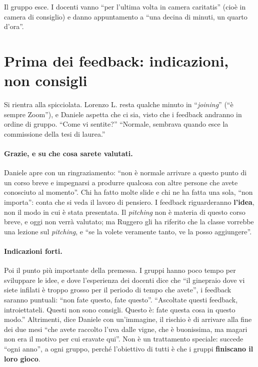 Il gruppo esce. I docenti vanno ``per l'ultima volta in camera caritatis'' (cioè in
camera di consiglio) e danno appuntamento a ``una decina di minuti, un quarto d'ora''.

\section{Prima dei feedback: indicazioni, non consigli}
\label{a11:sec:premessa}

Si rientra alla spicciolata. Lorenzo L. resta qualche minuto in ``\emph{joining}'' (``è
sempre Zoom''), e Daniele aspetta che ci sia, visto che i feedback andranno in ordine di
gruppo. ``Come vi sentite?'' ``Normale, sembrava quando esce la commissione della tesi di
laurea.''

\paragraph{Grazie, e su che cosa sarete valutati.} Daniele apre con un ringraziamento:
``non è normale arrivare a questo punto di un corso breve e impegnarsi a produrre
qualcosa con altre persone che avete conosciuto al momento''. Chi ha fatto molte slide e
chi ne ha fatta una sola, ``non importa'': conta che si veda il lavoro di pensiero. I
feedback riguarderanno \textbf{l'idea}, non il modo in cui è stata presentata. Il
\emph{pitching} non è materia di questo corso breve, e oggi non verrà valutato; ma Ruggero
gli ha riferito che la classe vorrebbe una lezione sul \emph{pitching}, e ``se la volete
veramente tanto, ve la posso aggiungere''.

\paragraph{Indicazioni forti.} Poi il punto più importante della premessa. I gruppi hanno
poco tempo per sviluppare le idee, e dove l'esperienza dei docenti dice che ``il
ginepraio dove vi siete infilati è troppo grosso per il periodo di tempo che avete'', i
feedback saranno puntuali: ``non fate questo, fate questo''. ``Ascoltate questi feedback,
introiettateli. Questi non sono consigli. Questo è: fate questa cosa in questo modo.''
Altrimenti, dice Daniele con un'immagine, il rischio è di arrivare alla fine dei due
mesi ``che avete raccolto l'uva dalle vigne, che è buonissima, ma magari non era il
motivo per cui eravate qui''. Non è un trattamento speciale: succede ``ogni anno'', a ogni
gruppo, perché l'obiettivo di tutti è che i gruppi \textbf{finiscano il loro gioco}.

